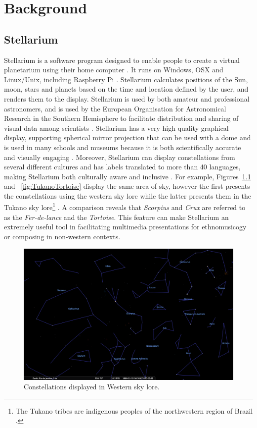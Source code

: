 \chapter{Background}
\section{Stellarium}
Stellarium is a software program designed to enable people to create a virtual planetarium using their home computer \cite{zottistellarium}. It runs on Windows, OSX and Linux/Unix, including Raspberry Pi \cite[p.~6]{zottistellarium}.  Stellarium calculates positions of the Sun, moon, stars and planets based on the time and location defined by the user, and renders them to the display.  Stellarium is used by both amateur and professional astronomers, and is used by the  European Organisation for Astronomical Research in the Southern Hemisphere to facilitate distribution and sharing of visual data among scientists \cite{berglund2008using}. Stellarium has a very high quality graphical display, supporting spherical mirror projection that can be used with a dome \cite{mc2009touring} and is used in many schools and museums because it is both scientifically accurate and visually engaging \cite{berglund2008using}.  Moreover, Stellarium can display constellations from several different cultures and has labels translated to more than 40 languages, making Stellarium both culturally aware and inclusive \cite{berglund2008using}.
For example,  Figures~\ref{fig:WesternCrux} and ~\ref{fig:TukanoTortoise} display the same area of sky, however the first presents the constellations using the western sky lore while the latter presents them in the Tukano sky lore\footnote{The Tukano tribes are indigenous peoples of the northwestern region of Brazil \cite{KnoblochFrancis1976TTIA}.} \cite{reichel1976cosmology}. A comparison reveals that \textit{Scorpius} and \textit{Crux} are referred to as the \textit{Fer-de-lance} and the \textit{Tortoise}. This feature can make Stellarium an extremely useful tool in facilitating multimedia presentations for ethnomusicogy or composing in non-western contexts.

\begin{figure}[htbp]
	\centering
	\includegraphics[width=1\columnwidth]{WesternCrux}
	\caption{Constellations displayed in Western sky lore.}
	\label{fig:WesternCrux}
\end{figure}

